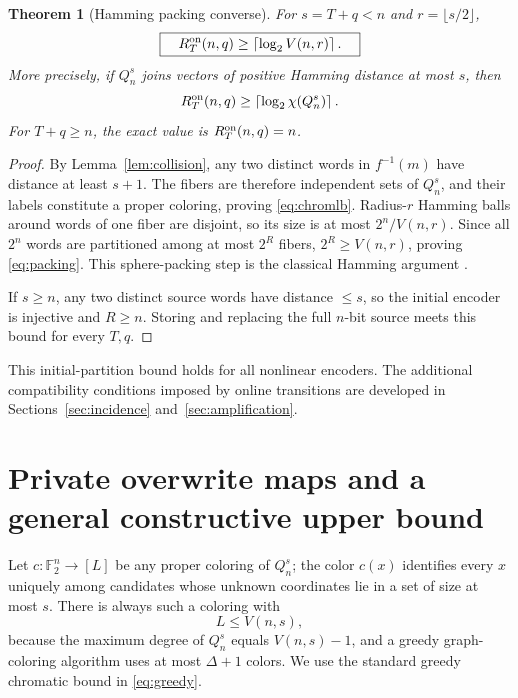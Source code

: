 \documentclass[11pt,a4paper]{article}
\newtheorem{theorem}{Theorem}[section]
\newcommand{\F}{\mathbb F_2}
\begin{document}
\begin{theorem}[Hamming packing converse]\label{thm:converse}
For $s=T+q<n$ and $r=\lfloor s/2\rfloor$,
\begin{equation}\label{eq:packing}
 \boxed{\quad R_T^{\rm on}(n,q)\ge \left\lceil\log_2 V(n,r)\right\rceil.\quad}
\end{equation}
More precisely, if $Q_n^s$ joins vectors of positive Hamming distance at most $s$, then
\begin{equation}\label{eq:chromlb}
R_T^{\rm on}(n,q)\ge\left\lceil\log_2\chi(Q_n^s)\right\rceil.
\end{equation}
For $T+q\ge n$, the exact value is $R_T^{\rm on}(n,q)=n$.
\end{theorem}
\begin{proof}
By Lemma~\ref{lem:collision}, any two distinct words in $f^{-1}(m)$ have distance at least $s+1$. The fibers are therefore independent sets of $Q_n^s$, and their labels constitute a proper coloring, proving \eqref{eq:chromlb}. Radius-$r$ Hamming balls around words of one fiber are disjoint, so its size is at most $2^n/V(n,r)$. Since all $2^n$ words are partitioned among at most $2^R$ fibers, $2^R\ge V(n,r)$, proving \eqref{eq:packing}. This sphere-packing step is the classical Hamming argument \cite{hamming1950,jiangvardy2004}.

If $s\ge n$, any two distinct source words have distance $\le s$, so the initial encoder is injective and $R\ge n$. Storing and replacing the full $n$-bit source meets this bound for every $T,q$.
\end{proof}

This initial-partition bound holds for all nonlinear encoders. The additional compatibility conditions imposed by online transitions are developed in Sections~\ref{sec:incidence} and~\ref{sec:amplification}.

\section{Private overwrite maps and a general constructive upper bound}
Let $c:\F^n\to[L]$ be any proper coloring of $Q_n^s$; the color $c(x)$ identifies every $x$ uniquely among candidates whose unknown coordinates lie in a set of size at most $s$. There is always such a coloring with
\begin{equation}\label{eq:greedy}
L\le V(n,s),
\end{equation}
because the maximum degree of $Q_n^s$ equals $V(n,s)-1$, and a greedy graph-coloring algorithm uses at most $\Delta+1$ colors. We use the standard greedy chromatic bound in \eqref{eq:greedy}.
\end{document}
